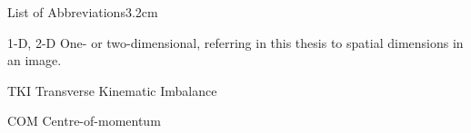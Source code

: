 \begin{mclistof}{List of Abbreviations}{3.2cm}

\item[1-D, 2-D] One- or two-dimensional, referring in this thesis to spatial dimensions in an image.

\item[TKI] Transverse Kinematic Imbalance
\item[COM] Centre-of-momentum

\end{mclistof} 
